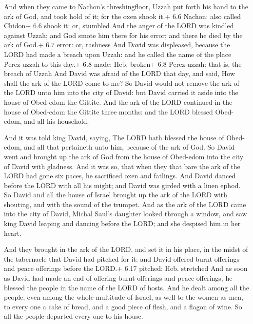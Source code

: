  And when they came to Nachon's threshingfloor, Uzzah put
forth his hand to the ark of God, and took hold of it; for the oxen
shook it.+ 6.6 Nachon: also called Chidon+ 6.6 shook it: or, stumbled
 And the anger of the LORD was kindled against Uzzah; and
God smote him there for his error; and there he died by the ark of God.+
6.7 error: or, rashness  And David was displeased, because
the LORD had made a breach upon Uzzah: and he called the name of the
place Perez-uzzah to this day.+ 6.8 made: Heb. broken+ 6.8 Perez-uzzah:
that is, the breach of Uzzah  And David was afraid of the
LORD that day, and said, How shall the ark of the LORD come to me?
 So David would not remove the ark of the LORD unto him
into the city of David: but David carried it aside into the house of
Obed-edom the Gittite.  And the ark of the LORD continued
in the house of Obed-edom the Gittite three months: and the LORD blessed
Obed-edom, and all his household.

 And it was told king David, saying, The LORD hath
blessed the house of Obed-edom, and all that pertaineth unto him,
because of the ark of God. So David went and brought up the ark of God
from the house of Obed-edom into the city of David with gladness.
 And it was so, that when they that bare the ark of the
LORD had gone six paces, he sacrificed oxen and fatlings. 
And David danced before the LORD with all his might; and David was
girded with a linen ephod.  So David and all the house of
Israel brought up the ark of the LORD with shouting, and with the sound
of the trumpet.  And as the ark of the LORD came into the
city of David, Michal Saul's daughter looked through a window, and saw
king David leaping and dancing before the LORD; and she despised him in
her heart.

 And they brought in the ark of the LORD, and set it in
his place, in the midst of the tabernacle that David had pitched for it:
and David offered burnt offerings and peace offerings before the LORD.+
6.17 pitched: Heb. stretched  And as soon as David had made
an end of offering burnt offerings and peace offerings, he blessed the
people in the name of the LORD of hosts.  And he dealt
among all the people, even among the whole multitude of Israel, as well
to the women as men, to every one a cake of bread, and a good piece of
flesh, and a flagon of wine. So all the people departed every one to his
house.

